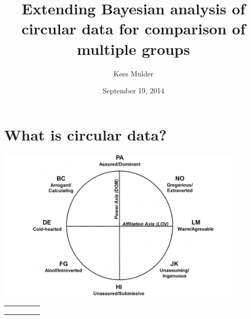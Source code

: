 \documentclass{beamer}
\title[Extending Bayesian analysis of circular data]{Extending Bayesian analysis of circular data for comparison of multiple groups} %
\author{Kees Mulder} %
\institute[UU] %
{
Utrecht University \\ %
\medskip
\textit{k.t.mulder@uu.nl} %
}
\date{September 19, 2014} %
\begin{document}
\begin{frame}
\titlepage
\end{frame}

\section{What is circular data?}

\begin{frame}

\begin{center}
\pause
\vspace{1.7cm}
\begin{minipage}{\framewidth}
\includegraphics[width=0.88\textwidth]{Examplepics/Leary.jpg}
\vspace{0.6cm}
\end{minipage}
\begin{minipage}{\framewidth}

\begin{center}
\begin{tabular}{lcccc}
         & \multicolumn{4}{c}{ } \\
 &&&& \\
 &&&& \\
\end{tabular}
\end{center}
\vspace{0.6cm}
\end{minipage}
\end{center}
\end{frame}
\end{document}
